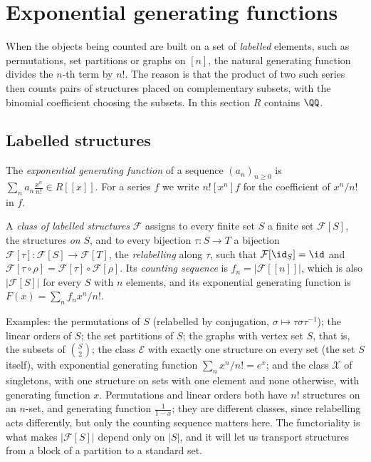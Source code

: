\section{Exponential generating functions}\label{generating-functions:section-exponential}

When the objects being counted are built on a set of \emph{labelled} elements, such as permutations, set partitions or graphs on $[n]$, the natural generating function divides the $n$-th term by
$n!$. The reason is that the product of two such series then counts pairs of structures placed on complementary subsets, with the binomial coefficient choosing the subsets. In this section $R$
contains $\QQ$.

\subsection{Labelled structures}\label{generating-functions:subsection-labelled}

\begin{definition}\label{generating-functions:definition-egf}
The \emph{exponential generating function} of a sequence $(a_n)_{n \geq 0}$ is $\sum_na_n\frac{x^n}{n!} \in R[[x]]$. For a series $f$ we write $n![x^n]f$ for the coefficient of $x^n/n!$ in $f$.
\end{definition}

\begin{definition}\label{generating-functions:definition-species}
A \emph{class of labelled structures} $\mathcal{F}$ assigns to every finite set $S$ a finite set $\mathcal{F}[S]$, the structures \emph{on} $S$, and to every bijection $\tau \colon S \to T$ a bijection
$\mathcal{F}[\tau] \colon \mathcal{F}[S] \to \mathcal{F}[T]$, the \emph{relabelling} along $\tau$, such that $\mathcal{F}[\id_S] = \id$ and $\mathcal{F}[\tau \circ \rho] = \mathcal{F}[\tau] \circ \mathcal{F}[\rho]$.
Its \emph{counting sequence} is $f_n = |\mathcal{F}[[n]]|$, which is also $|\mathcal{F}[S]|$ for every $S$ with $n$ elements, and its exponential generating function is $F(x) = \sum_nf_nx^n/n!$.
\end{definition}

Examples: the permutations of $S$ (relabelled by conjugation, $\sigma \mapsto \tau\sigma\tau^{-1}$); the linear orders of $S$; the set partitions of $S$; the graphs with vertex set $S$, that is, the
subsets of $\binom{S}{2}$; the class $\mathcal{E}$ with exactly one structure on every set (the set $S$ itself), with exponential generating function $\sum_nx^n/n! = e^x$; and the class $\mathcal{X}$ of
singletons, with one structure on sets with one element and none otherwise, with generating function $x$. Permutations and linear orders both have $n!$ structures on an $n$-set, and generating
function $\frac{1}{1 - x}$; they are different classes, since relabelling acts differently, but only the counting sequence matters here. The functoriality is what makes $|\mathcal{F}[S]|$ depend only on
$|S|$, and it will let us transport structures from a block of a partition to a standard set.

